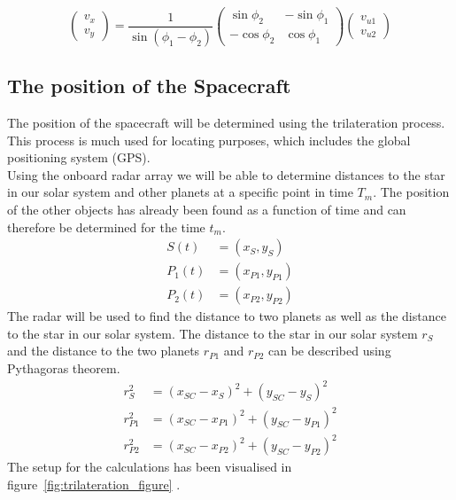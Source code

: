 \documentclass[reprint,english,notitlepage]{revtex4-2}
\begin{document}
\[
    \begin{pmatrix}
        v_x\\
		v_y
    \end{pmatrix}
	 = \frac{1}{\sin\left(\phi_1 - \phi_2 \right)}
	\begin{pmatrix}
	    \sin \phi_2 & -\sin \phi_1\\
		-\cos \phi_2 & \cos \phi_1
	\end{pmatrix}
	\begin{pmatrix}
		v_{u1}\\ v_{u2}
	\end{pmatrix}
\]


\subsection{The position of the Spacecraft}\label{subsec:the-position-of-the-spacecraft}
The position of the spacecraft will be determined using the trilateration process.
This process is much used for locating purposes, which includes the global positioning system (GPS).\\
Using the onboard radar array we will be able to determine distances to the star in our solar system and other planets at a specific point in time $T_m$.
The position of the other objects has already been found as a function of time and can therefore be determined for the time $t_m$.\\
\begin{align*}
    S\left(t \right) &= \left(x_S, y_S \right)\\
	P_1\left(t \right) &= \left(x_{P1}, y_{P1} \right)\\
	P_2\left(t \right) &= \left(x_{P2}, y_{P2} \right)
\end{align*}
The radar will be used to find the distance to two planets as well as the distance to the star in our solar system.
The distance to the star in our solar system $r_S$ and the distance to the two planets $r_{P1}$ and $r_{P2}$ can be described using Pythagoras theorem.
\begin{align}
    r_S^2 &= (x_{SC} - x_S)^2 + (y_{SC} - y_S)^2 \label{r_s}\\
	r_{P1}^2 &= (x_{SC} - x_{P1})^2 + (y_{SC} - y_{P1})^2 \label{r_p1}\\
	r_{P2}^2 &= (x_{SC} - x_{P2})^2 + (y_{SC} - y_{P2})^2  \label{r_p2}
\end{align}
The setup for the calculations has been visualised in figure~\ref{fig:trilateration_figure} .
\end{document}
